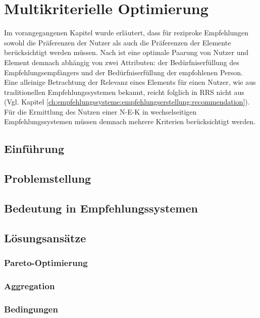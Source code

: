 
\chapter{Multikriterielle Optimierung}
\label{ch:erweiterungen}
Im vorangegangenen Kapitel wurde erläutert, dass für reziproke Empfehlungen sowohl die Präferenzen der Nutzer als auch die Präferenzen der Elemente berücksichtigt werden müssen.
Nach \textcite[S. 36]{li:inproceedings} ist eine optimale Paarung von Nutzer und Element demnach abhängig von zwei Attributen: der Bedürfniserfüllung des Empfehlungsempfängers und der Bedürfniserfüllung der empfohlenen Person.
Eine alleinige Betrachtung der Relevanz eines Elements für einen Nutzer, wie aus traditionellen Empfehlungssystemen bekannt, reicht folglich in \ac{RRS} nicht aus (Vgl. Kapitel \ref{ch:empfehlungssysteme:empfehlungserstellung:recommendation}).
Für die Ermittlung des Nutzen einer \ac{N-E-K} in wechselseitigen Empfehlungssystemen müssen demnach mehrere Kriterien berücksichtigt werden.

\section{Einführung}
\label{ch:erweiterungen:einführung}


\section{Problemstellung}

\section{Bedeutung in Empfehlungssystemen}

\section{Lösungsansätze}

\subsection{Pareto-Optimierung}

\subsection{Aggregation}

\subsection{Bedingungen}


